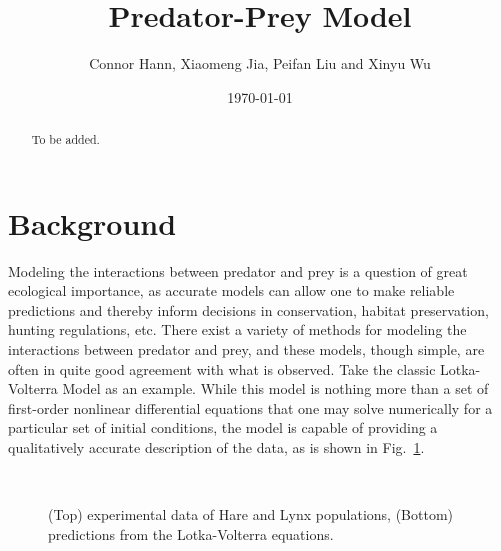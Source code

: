 \documentclass[aps,prl,preprint,superscriptaddress]{revtex4}
\begin{document}
	
	
	\title{Predator-Prey Model}%
	
	\author{Connor Hann, Xiaomeng Jia, Peifan Liu and Xinyu Wu}
	
	
	\date{\today}
	
	\begin{abstract}
		To be added.
	\end{abstract}
	
	\maketitle
	
	
	
	\section{Background} 
Modeling the interactions between predator and prey is a question of great ecological importance, as accurate models can allow one to make reliable predictions and thereby inform decisions in conservation, habitat preservation, hunting regulations, etc. There exist a variety of methods for modeling the interactions between predator and prey, and these models, though simple, are often in quite good agreement with what is observed. Take the classic Lotka-Volterra Model as an example. While this model is nothing more than a set of first-order nonlinear differential equations that one may solve numerically for a particular set of initial conditions, the model is capable of providing a qualitatively accurate description of the data, as is shown in Fig.~\ref{LV}. 

\begin{figure}[H]
	\centering
	\\
	\caption{(Top) experimental data of Hare and Lynx populations, (Bottom) predictions from the Lotka-Volterra equations. }
	\label{LV} 
\end{figure}
\end{document}
